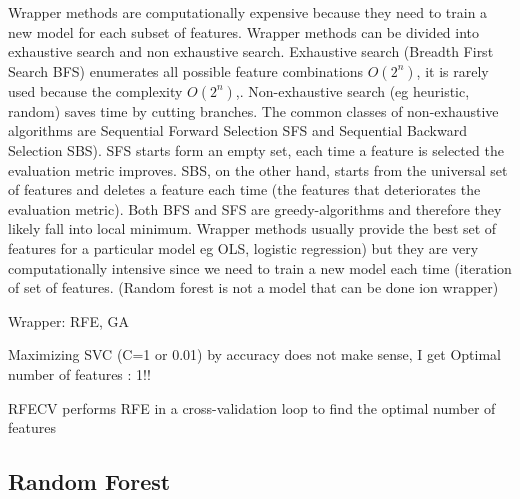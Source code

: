 \documentclass[preprint,12pt]{elsarticle}
\begin{document}
Wrapper methods are computationally expensive because they need to train a new model for each subset of features.
Wrapper methods can be divided into exhaustive search and non exhaustive search. 
 Exhaustive search (Breadth First Search BFS) enumerates all possible feature combinations $O(2^n)$, it is rarely used because the complexity $O(2^n)$,. Non-exhaustive search (eg heuristic, random) saves time by cutting branches. The common classes of non-exhaustive algorithms are Sequential Forward Selection SFS and Sequential Backward Selection SBS). SFS starts form an empty set, each time a feature is selected the evaluation metric improves. SBS, on the other hand, starts from the universal set of features and deletes a feature each time (the features that deteriorates the evaluation metric). Both BFS and SFS are greedy-algorithms and therefore they likely fall into local minimum. Wrapper methods usually provide the best set of features for a particular model eg OLS, logistic regression) but they are very computationally intensive since we need to train a new model each time (iteration of set of features. (Random forest is not a model that can be done ion wrapper)


Wrapper: RFE, GA

Maximizing SVC (C=1 or 0.01) by accuracy does not make sense, I get Optimal number of features : 1!!

RFECV performs RFE in a cross-validation loop to find the optimal number of features


\subsection{Random Forest}
\end{document}
